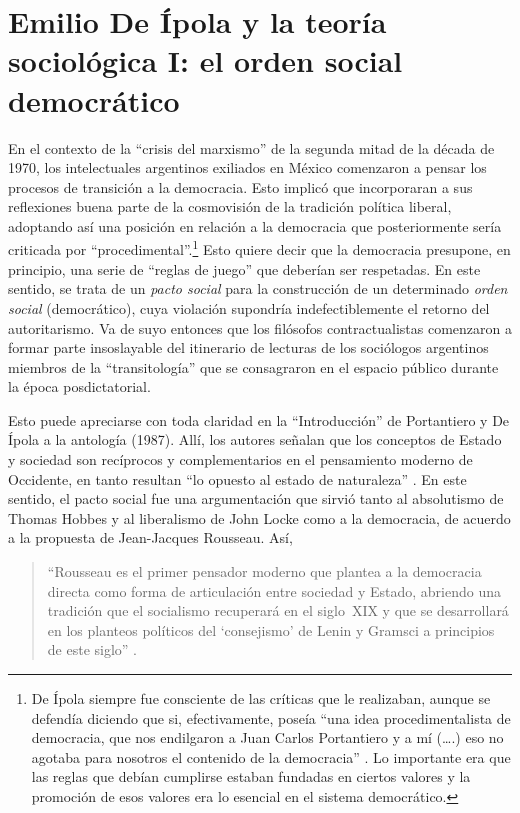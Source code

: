 {\section{Emilio De Ípola y la teoría sociológica I: el orden social democrático}

En el contexto de la \enquote{crisis del marxismo} de la segunda mitad de la década de 1970, los intelectuales argentinos exiliados en México comenzaron a pensar los procesos de transición a la democracia. Esto implicó que incorporaran a sus reflexiones buena parte de la cosmovisión de la tradición política liberal, adoptando así una posición en relación a la democracia que posteriormente sería criticada por \enquote{procedimental}.\footnote{De Ípola siempre fue consciente de las críticas que le realizaban, aunque se defendía diciendo que si, efectivamente, poseía \enquote{una idea procedimentalista de democracia,  que nos endilgaron a Juan Carlos Portantiero y a mí (\dots.) eso no agotaba para nosotros el contenido de la democracia} \parencite[101]{1525-RINESI2004}. Lo importante era que las reglas que debían cumplirse estaban fundadas en ciertos valores y la promoción de esos valores era lo esencial en el sistema democrático.} Esto quiere decir que la democracia presupone, en principio, una serie de \enquote{reglas de juego} que deberían ser respetadas. En este sentido, se trata de un \emph{pacto social} para la construcción de un determinado \emph{orden social} (democrático), cuya violación supondría indefectiblemente el retorno del autoritarismo. Va de suyo entonces que los filósofos contractualistas comenzaron a formar parte insoslayable del itinerario de lecturas de los sociólogos argentinos miembros de la \enquote{transitología} \parencite{1695-LESGART2003} que se consagraron en el espacio público durante la época posdictatorial.

Esto puede apreciarse con toda claridad en la \enquote{Introducción} de Portantiero y De Ípola a la antología  (1987). Allí, los autores señalan que los conceptos de Estado y sociedad son recíprocos y complementarios en el pensamiento moderno de Occidente, en tanto resultan \enquote{lo opuesto al estado de naturaleza} \parencite[7]{1540-PORTANTIERO1987}. En este sentido, el pacto social fue una argumentación que sirvió tanto al absolutismo de Thomas Hobbes y al liberalismo de John Locke como a la democracia, de acuerdo a la propuesta de Jean-Jacques Rousseau. Así,

\begin{quote}
\enquote{Rousseau es el primer pensador moderno que plantea a la democracia directa como forma de articulación entre sociedad y Estado, abriendo una tradición que el socialismo recuperará en el siglo~XIX y que se desarrollará en los planteos políticos del \enquote{consejismo} de Lenin y Gramsci a principios de este siglo} \parencite[10]{1540-PORTANTIERO1987}.
\end{quote}

}

